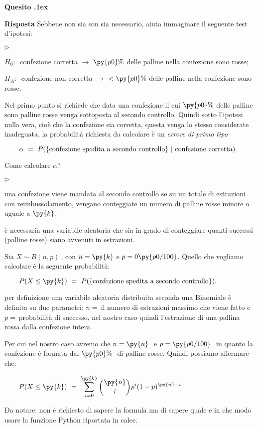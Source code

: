 \documentclass[11pt,twoside,a4paper]{article}
\newcommand{\mylabel}[1]{#1\hfill}
\renewenvironment{itemize}
  {\begin{list}{$\triangleright$}{%
   \setlength{\parskip}{0mm}
   \setlength{\topsep}{.4\baselineskip}
   \setlength{\rightmargin}{0mm}
   \setlength{\listparindent}{0mm}
   \setlength{\itemindent}{0mm}
   \setlength{\labelwidth}{2ex}
   \setlength{\itemsep}{.4\baselineskip}
   \setlength{\parsep}{0mm}
   \setlength{\partopsep}{0mm}
   \setlength{\labelsep}{1ex}
   \setlength{\leftmargin}{\labelwidth+\labelsep}
   \let\makelabel\mylabel}}{%
   \end{list}\vspace*{-1.3mm}}
\newcounter{quesito}
\newenvironment{question}{\addtocounter{quesito}{1}\par\textbf{Quesito \thequesito.\kern1ex}}{\vspace{0.5\parskip}}
\newenvironment{answer}{\par\textbf{Risposta\quad}}{\vspace{\parskip}}
\begin{document}
\begin{question}
\begin{answer}
Sebbene non sia son sia necessario, aiuta immaginare il seguente test d'ipotesi:
\begin{itemize}
\item $H_0:\ $ confezione corretta $\rightarrow$ $\py{p0}\%$ delle palline nella confezione sono rosse;
\item $H_A:\ $ confezione non corretta $\rightarrow$ $< \py{p0}\%$ delle palline nella confezione sono rosse.
\end{itemize} 
Nel primo punto si richiede che data una confezione il cui $\py{p0} \% $ delle palline sono palline rosse  venga sottoposta al secondo controllo. Quindi sotto l'ipotesi nulla vera, cioè che la confezione sia corretta, questa venga lo stesso considerate inadeguata, la probabilità richiesta da calcolare è un \textit{errore di primo tipo}

$\qquad
\alpha\ =\ P(\{{\rm confezione\ spedita\ a\ secondo\ controllo}\}\ | {\rm\ confezione\ corretta})
$

Come calcolare $\alpha$? 
\begin{itemize}
\item una confezione viene mandata al secondo controllo se su un totale di  estrazioni con reimbussolamento, vengano conteggiate un numero di palline rosse minore o uguale a $\py{k}$.
\item è necessaria una variabile aleatoria che sia in grado di conteggiare quanti successi (palline rosse) siano avvenuti in  estrazioni.
\item Sia $X\sim B(n,p)\ $, con $n=\py{k}$ e $p=0\py{p0/100}$. Quello che vogliamo calcolare è la seguente probabilità:

$\qquad
P(X\le \py{k})\ =\ P(\{\rm confezione\ spedita\ a\ secondo\ controllo\}).
$

\item per definizione una variabile aleatoria distribuita seconda una Binomiale è definita su due parametri: $n=\ $il numero di estrazioni massimo che viene fatto e $p=\ $probabilità di successo, nel nostro caso quindi l'estrazione di una pallina rossa dalla confezione intera. 
\end{itemize}
Per cui nel nostro caso avremo che $n=\py{n}\ $ e $p=\py{p0/100}\ $ in quanto la confezione è formata dal $\py{p0}\%\ $ di palline rosse. Quindi possiamo affermare che:

$\qquad\displaystyle
P(X\le \py{k})\ =\  \sum_{i=0}^{\py{k}}\binom{\py{n}}{i} p^i (1-p)^{\py{n}-i} 
$

Da notare: non è richiesto di sapere la formula ma di sapere quale e in che modo usare la funzione Python riportata in calce.


\end{answer}
\end{question}
\end{document}

